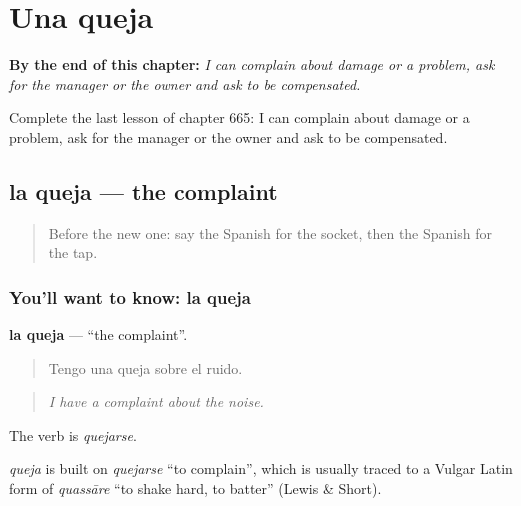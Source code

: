 
\chapter{Una queja}
\label{ch:es-una-queja}

\begin{chapteropening}
\textbf{By the end of this chapter:} \emph{I can complain about damage or a problem, ask for the manager or the owner and ask to be compensated.}

Complete the last lesson of chapter 665: I can complain about damage or a problem, ask for the manager or the owner and ask to be compensated.
\end{chapteropening}

\section[la queja]{la queja — the complaint}

\label{lesson:ES-C665-queja}



\begin{quote}
Before the new one: say the Spanish for the socket, then the Spanish for the tap.
\end{quote}

\subsection*{You'll want to know: la queja}
\textbf{la queja} — \textquotedblleft{}the complaint\textquotedblright{}.

\begin{quote}
Tengo una queja sobre el ruido.
\end{quote}

\begin{quote}
\emph{I have a complaint about the noise.}
\end{quote}

The verb is \emph{quejarse}.

\begin{cousinweb}
\emph{queja} is built on \emph{quejarse} \textquotedblleft{}to complain\textquotedblright{}, which is usually traced to a Vulgar Latin form of \emph{quassāre} \textquotedblleft{}to shake hard, to batter\textquotedblright{} (Lewis \& Short).
\end{cousinweb}


